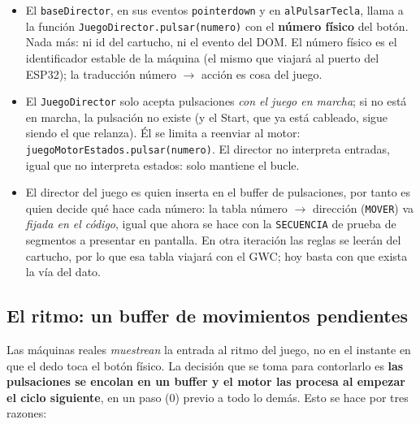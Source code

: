 \begin{itemize}
	\item El \texttt{baseDirector}, en sus eventos \texttt{pointerdown} y en
	\texttt{alPulsarTecla}, llama a la función \texttt{JuegoDirector.pulsar(numero)} con el
	\textbf{número físico} del botón. Nada más: ni id del cartucho, ni el evento del DOM.
	El número físico es el identificador estable de la máquina (el mismo que viajará al
	puerto del ESP32); la traducción número $\rightarrow$ acción es cosa del juego.

	\item El \texttt{JuegoDirector} solo acepta pulsaciones \emph{con el juego en marcha};
	si no está en marcha, la pulsación no existe (y el Start, que ya está cableado, sigue
	siendo el que relanza). Él se limita a reenviar al motor:
	\texttt{juegoMotorEstados.pulsar(numero)}. El director no interpreta entradas, igual
	que no interpreta estados: solo mantiene el bucle.

	\item El director del juego es quien inserta en el buffer de pulsaciones, por tanto es 
	quien decide qué hace cada número: la tabla número $\rightarrow$ dirección (\texttt{MOVER})
	va \emph{fijada en el código}, igual que ahora se hace con la \texttt{SECUENCIA} de prueba de segmentos a presentar en pantalla. En otra iteración las reglas se leerán del cartucho, por lo que esa tabla viajará con el GWC; hoy basta con que exista la vía del dato.
\end{itemize}

\subsection{El ritmo: un buffer de movimientos pendientes}
\label{subsec:BufferEntrada}

Las máquinas reales \emph{muestrean} la entrada al ritmo del juego, no en el instante en
que el dedo toca el botón físico. La decisión que se toma para contorlarlo es \textbf{las pulsaciones se encolan en un buffer y el motor las procesa al empezar el ciclo siguiente},
en un paso (0) previo a todo lo demás. Esto se hace por tres razones:

